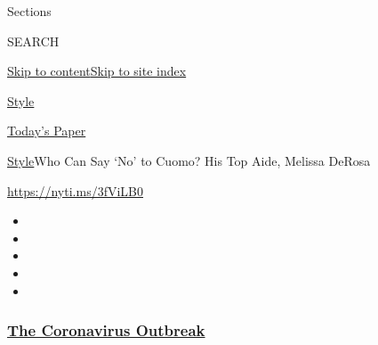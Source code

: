 Sections

SEARCH

\protect\hyperlink{site-content}{Skip to
content}\protect\hyperlink{site-index}{Skip to site index}

\href{https://www.nytimes3xbfgragh.onion/section/style}{Style}

\href{https://myaccount.nytimes3xbfgragh.onion/auth/login?response_type=cookie\&client_id=vi}{}

\href{https://www.nytimes3xbfgragh.onion/section/todayspaper}{Today's
Paper}

\href{/section/style}{Style}\textbar{}Who Can Say `No' to Cuomo? His Top
Aide, Melissa DeRosa

\url{https://nyti.ms/3fViLB0}

\begin{itemize}
\item
\item
\item
\item
\item
\end{itemize}

\hypertarget{the-coronavirus-outbreak}{%
\subsubsection{\texorpdfstring{\href{https://www.nytimes3xbfgragh.onion/news-event/coronavirus?name=styln-coronavirus-national\&region=TOP_BANNER\&block=storyline_menu_recirc\&action=click\&pgtype=Article\&impression_id=1ba06ea0-f1f2-11ea-bdf2-59589793bb43\&variant=undefined}{The
Coronavirus
Outbreak}}{The Coronavirus Outbreak}}\label{the-coronavirus-outbreak}}

